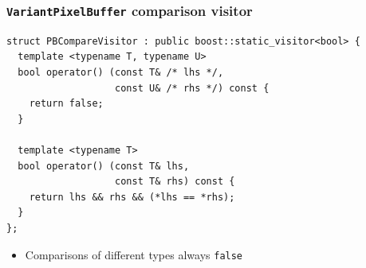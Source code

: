\documentclass[handout]{beamer}
\begin{document}
\begin{frame}[fragile]
  \frametitle{\texttt{VariantPixelBuffer} comparison visitor}
  \scriptsize
  \begin{lstlisting}
struct PBCompareVisitor : public boost::static_visitor<bool> {
  template <typename T, typename U>
  bool operator() (const T& /* lhs */,
                   const U& /* rhs */) const {
    return false;
  }

  template <typename T>
  bool operator() (const T& lhs,
                   const T& rhs) const {
    return lhs && rhs && (*lhs == *rhs);
  }
};
\end{lstlisting}
  \begin{itemize}
    \pause
  \item Comparisons of different types always \texttt{false}
  \end{itemize}
\end{frame}
\end{document}
